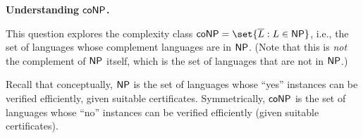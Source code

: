 \documentclass[11pt,addpoints]{exam}
\begin{document}
\begin{questions}
  \question \textbf{Understanding $\textsf{coNP}$.}
  
  This question explores the complexity class $\coNP = \set{\overline{L} : L\in\NP}$, i.e., the set of languages whose complement languages are in $\textsf{NP}$.
  (Note that this is \emph{not} the complement of $\textsf{NP}$ itself, which is the set of languages that are not in $\textsf{NP}$.)
  
  Recall that conceptually, $\textsf{NP}$ is the set of languages whose ``yes'' instances can be verified efficiently, given suitable certificates.
  Symmetrically, $\textsf{coNP}$ is the set of languages whose ``no'' instances can be verified efficiently (given suitable certificates).
    
  

\end{questions}
\end{document}
